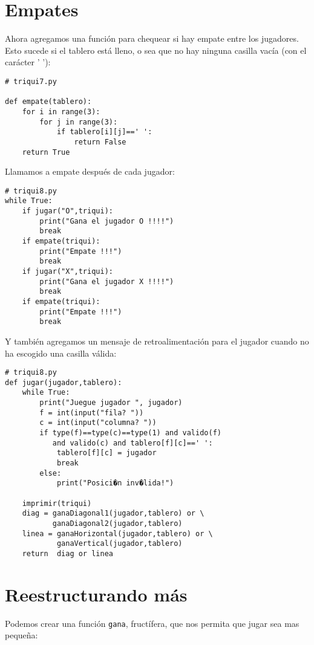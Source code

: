 \section{Empates}

Ahora agregamos una función para chequear si hay empate entre los
jugadores. Esto sucede si el tablero está lleno, o sea que no hay
ninguna casilla vacía (con el carácter ' '):

\begin{lstlisting}
# triqui7.py

def empate(tablero):
    for i in range(3):
        for j in range(3):
            if tablero[i][j]==' ':
                return False
    return True
\end{lstlisting}
Llamamos a empate después de cada jugador: 

\begin{lstlisting}
# triqui8.py
while True:
    if jugar("O",triqui):
        print("Gana el jugador O !!!!")
        break
    if empate(triqui):
        print("Empate !!!")
        break
    if jugar("X",triqui):
        print("Gana el jugador X !!!!")
        break
    if empate(triqui):
        print("Empate !!!")
        break
\end{lstlisting}
Y también agregamos un mensaje de retroalimentación para el jugador
cuando no ha escogido una casilla válida:

\begin{lstlisting}
# triqui8.py
def jugar(jugador,tablero):
    while True:     
        print("Juegue jugador ", jugador)
        f = int(input("fila? "))
        c = int(input("columna? "))
        if type(f)==type(c)==type(1) and valido(f) 
           and valido(c) and tablero[f][c]==' ':
            tablero[f][c] = jugador
            break
        else:
            print("Posici�n inv�lida!")

    imprimir(triqui)
    diag = ganaDiagonal1(jugador,tablero) or \
           ganaDiagonal2(jugador,tablero)
    linea = ganaHorizontal(jugador,tablero) or \
            ganaVertical(jugador,tablero)
    return  diag or linea
\end{lstlisting}
\section{Reestructurando más}

Podemos crear una función \texttt{gana}, fructífera, que nos permita
que jugar sea mas pequeña:

